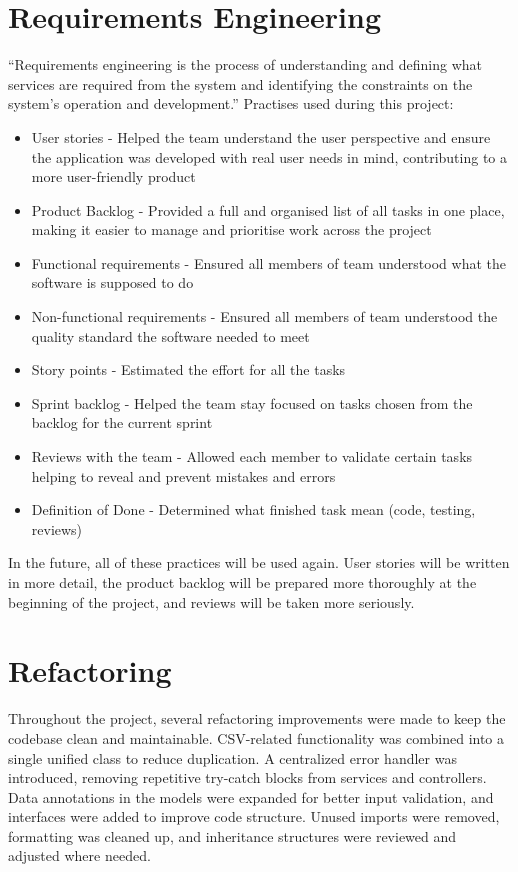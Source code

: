 \section{Requirements Engineering}
\hspace*{1cm} ``Requirements engineering is the process of understanding and defining what services are required from the system and identifying the constraints on the system's operation and development.''\cite{scrumguide} Practises used during this project:
\begin{itemize}
    \item User stories - Helped the team understand the user perspective and ensure the application was developed with real user needs in mind, contributing to a more user-friendly product
    \item Product Backlog - Provided a full and organised list of all tasks in one place, making it easier to manage and prioritise work across the project
    \item Functional requirements - Ensured all members of team understood what the software is supposed to do
    \item Non-functional requirements - Ensured all members of team understood the quality standard the software needed to meet
    \item Story points - Estimated the effort for all the tasks
    \item Sprint backlog - Helped the team stay focused on tasks chosen from the backlog for the current sprint
    \item Reviews with the team - Allowed each member to validate certain tasks helping to reveal and prevent mistakes and errors
    \item Definition of Done - Determined what finished task mean (code, testing, reviews)
\end{itemize}
\hspace*{1cm} In the future, all of these practices will be used again. User stories will be written in more detail, the product backlog will be prepared more thoroughly at the beginning of the project, and reviews will be taken more seriously.

\section{Refactoring}
\hspace*{1cm} Throughout the project, several refactoring improvements were made to keep the codebase clean and maintainable. CSV-related functionality was combined into a single unified class to reduce duplication. A centralized error handler was introduced, removing repetitive try-catch blocks from services and controllers. Data annotations in the models were expanded for better input validation, and interfaces were added to improve code structure. Unused imports were removed, formatting was cleaned up, and inheritance structures were reviewed and adjusted where needed.

